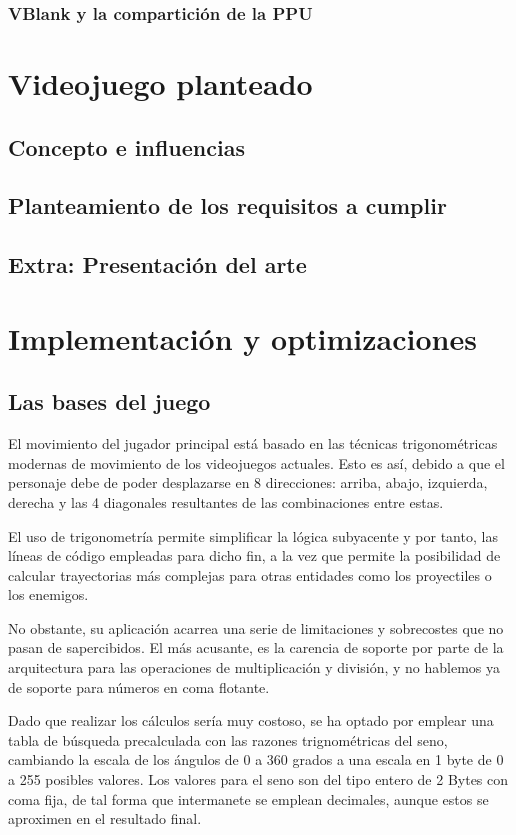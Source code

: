 \documentclass[12pt]{article}
\begin{document}
        \subsubsection{VBlank y la compartición de la PPU}

\section{Videojuego planteado}
    \subsection{Concepto e influencias}
    \subsection{Planteamiento de los requisitos a cumplir}
    \subsection{Extra: Presentación del arte}

\section{Implementación y optimizaciones}
    \subsection{Las bases del juego}

    El movimiento del jugador principal está basado en las técnicas trigonométricas modernas de movimiento de los videojuegos actuales.
    Esto es así, debido a que el personaje debe de poder desplazarse en 8 direcciones: arriba, abajo, izquierda, derecha y las 4 diagonales
    resultantes de las combinaciones entre estas. 

    El uso de trigonometría permite simplificar la lógica subyacente y por tanto, las líneas de código empleadas para dicho fin, a la vez
    que permite la posibilidad de calcular trayectorias más complejas para otras entidades como los proyectiles o los enemigos.

    No obstante, su aplicación acarrea una serie de limitaciones y sobrecostes que no pasan de sapercibidos. El más acusante, es la
    carencia de soporte por parte de la arquitectura para las operaciones de multiplicación y división, y no hablemos ya de soporte
    para números en coma flotante.

    Dado que realizar los cálculos sería muy costoso, se ha optado por emplear una tabla de búsqueda precalculada con las razones trignométricas
    del seno, cambiando la escala de los ángulos de 0 a 360 grados a una escala en 1 byte de 0 a 255 posibles valores. Los valores para el seno
    son del tipo entero de 2 Bytes con coma fija, de tal forma que intermanete se emplean decimales, aunque estos se aproximen en el resultado final.
    
\end{document}
